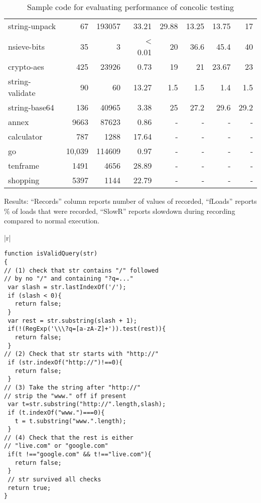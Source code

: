 \documentclass{sig-alternate}
\begin{document}
\begin{table*}
\begin{minipage}{0.6\textwidth}
{\begin{center}
\begin{tabular}{|l|r|r|r|r|r|r|r|}
string-unpack& 67 & 193057 & 33.21 & 29.88 & 13.25 & 13.75 & 17\\
nsieve-bits& 35 & 3 & < 0.01 & 20 & 36.6 & 45.4 & 40 \\
crypto-aes& 425 & 23926 &0.73  & 19 & 21 & 23.67 & 23 \\
string-validate& 90 & 60 & 13.27 & 1.5 & 1.5 & 1.4 & 1.5\\
string-base64& 136 & 40965 & 3.38 & 25 & 27.2 & 29.6 & 29.2\\
\hline 
annex& 9663 & 87623 & 0.86 & - & - & - & - \\
calculator& 787 & 1288 & 17.64 & - & - & - & - \\
 go& 10,039 & 114609 & 0.97 & - & - & - & - \\
tenframe& 1491 &4656 & 28.89 & - & - & - & - \\
shopping& 5397 & 1144 & 22.79 & - & - & - & - \\
\hline 
\end{tabular}
\end{center}}
\caption{Results: ``Records'' column reports number of values of recorded,
``fLoads'' reports \% of loads that were recorded, ``SlowR'' reports
slowdown during recording compared to normal execution.}
\label{tab:results}
\end{minipage}
\begin{minipage}{0.38\textwidth}
\begin{tabular}{|r|}
\hline\\
{\scriptsize
\begin{lstlisting}[mathescape]
function isValidQuery(str)
{
// (1) check that str contains "/" followed
// by no "/" and containing "?q=..."
 var slash = str.lastIndexOf('/');
 if (slash < 0){
   return false;
 }
 var rest = str.substring(slash + 1);
 if(!(RegExp('\\\?q=[a-zA-Z]+')).test(rest)){
   return false;
 }
// (2) Check that str starts with "http://"
 if (str.indexOf("http://")!==0){
   return false;
 }
// (3) Take the string after "http://"
// strip the "www." off if present
 var t=str.substring("http://".length,slash);
 if (t.indexOf("www.")===0){
   t = t.substring("www.".length);
 }
// (4) Check that the rest is either
// "live.com" or "google.com"
 if(t !=="google.com" && t!=="live.com"){
   return false;
 }
 // str survived all checks
 return true;
}

\end{lstlisting}
}\\
\hline
\end{tabular}
\caption{Sample code for evaluating performance of concolic testing}
\label{tab:conc}
\end{minipage}
\end{table*}
\end{document}
